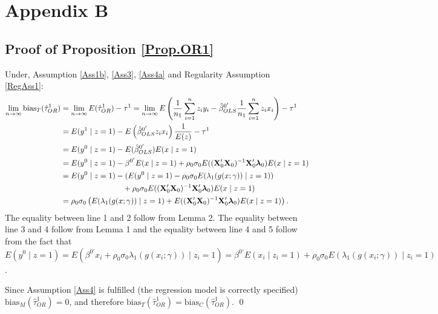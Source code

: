 \documentclass[11pt]{article}
\newcommand{\X}{{\bf X}}
\newcommand{\limes}{\lim \limits_{n\to\infty}}
\newcommand{\bias}{\mbox{bias}}
\begin{document}
\section*{Appendix B}
\subsection*{Proof of Proposition \ref{Prop.OR1}}

Under, Assumption \ref{Ass1b}, \ref{Ass3}, \ref{Ass4a} and Regularity Assumption \ref{RegAss1}: 
\begin{align*}
\limes \mbox{bias}_T(\hat \tau_{OR}^1)&=\limes E(\hat\tau^1_{OR})- \tau^1=\limes E\left(\frac{1}{n_1}\sum \limits_{i =1}^nz_i y_i-\hat\beta^{0'}_{OLS}\frac{1}{n_1}\sum_{i =1}^{n} z_i x_i \right) - \tau^1\\
&= E(y^1\mid z=1) - E\left(\hat\beta^{0'}_{OLS} z_i x_i \right) \frac{1}{E(z)} - \tau^1\\
&= E(y^0\mid z=1)-E(\hat\beta^{0'}_{OLS})E(x\mid z=1)  \\
&=E(y^0\mid z=1)-\beta^{0'} E(x\mid z=1) +  \rho_0 \sigma_0 E((\X_0'\X_0)^{-1}\X_0' \boldsymbol \lambda_0) E(x\mid z=1) \\
&=E(y^0\mid z=1)-(E(y^0\mid z=1)-\rho_0\sigma_0 E(\lambda_1(g(x; \gamma)) \mid z=1)) \\
&\qquad\qquad\qquad\qquad+  \rho_0 \sigma_0 E((\X_0'\X_0)^{-1}\X_0' \boldsymbol \lambda_0) E(x\mid z=1)  \\
&= \rho_0\sigma_0 \left( E(\lambda_1(g(x; \gamma))\mid z=1)+ E((\X_0'\X_0)^{-1}\X_0' \boldsymbol \lambda_0) E(x\mid z=1)\right). 
\end{align*}
The equality between line 1 and 2 follow from Lemma 2. The equality between line 3 and 4 follow from Lemma 1 and the equality between line 4 and 5 follow from the fact that $E(y^0\mid z=1)=E(\beta^{0'}x_i +\rho_0\sigma_0\lambda_1(g(x_i; \gamma))\mid z_i=1)=\beta^{0'}E(x_i\mid z_i=1) +\rho_0\sigma_0E(\lambda_1(g(x_i; \gamma))\mid z_i=1)$. 

Since Assumption \ref{Ass4} is fulfilled (the regression model is correctly specified) $\bias_M(\hat \tau_{OR}^1)=0$, and therefore $\bias_T(\hat \tau_{OR}^1)=\bias_C(\hat \tau_{OR}^1)$. \qed
\end{document}
